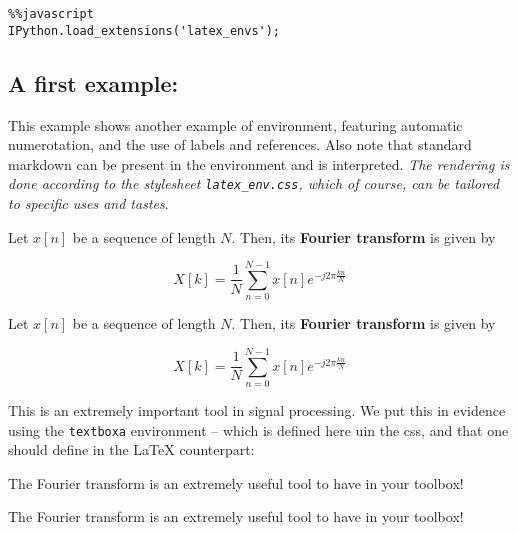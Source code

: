 \begin{verbatim}
%%javascript 
IPython.load_extensions('latex_envs');
\end{verbatim}

    \subsection{A first example:}\label{a-first-example}

    This example shows another example of environment, featuring automatic
numerotation, and the use of labels and references. Also note that
standard markdown can be present in the environment and is interpreted.
\emph{The rendering is done according to the stylesheet
\texttt{latex\_env.css}, which of course, can be tailored to specific
uses and tastes}.

    \begin{listing}
\begin{definition}
\label{def:FT} Let $x[n]$ be a sequence of length $N$. Then, its
\textbf{Fourier transform} is given by

\begin{equation}
\label{eq:FT}
X[k]= \frac{1}{N} \sum_{n=0}^{N-1} x[n] e^{-j2\pi \frac{kn}{N}}
\end{equation}
\end{definition}
\end{listing}

    \begin{definition}
\label{def:FT} Let $x[n]$ be a sequence of length $N$. Then, its
\textbf{Fourier transform} is given by

\begin{equation}
\label{eq:FT2}
X[k]= \frac{1}{N} \sum_{n=0}^{N-1} x[n] e^{-j2\pi \frac{kn}{N}}
\end{equation}
\end{definition}

    This is an extremely important tool in signal processing. We put this in
evidence using the \texttt{textboxa} environment -- which is defined
here uin the css, and that one should define in the LaTeX counterpart:

\begin{listing}
\begin{textboxa}
The Fourier transform is an extremely useful tool to have in your toolbox!
\end{textboxa}
\end{listing}

    \begin{textboxa}
The Fourier transform is an extremely useful tool to have in your toolbox!
\end{textboxa}


